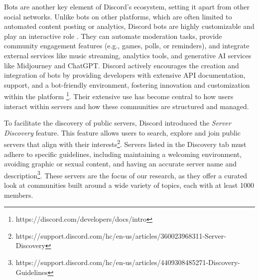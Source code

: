 Bots are another key element of Discord’s ecosystem, setting it apart from other social networks. Unlike bots on other platforms, which are often limited to automated content posting or analytics, Discord bots are highly customizable and play an interactive role \cite{moderation-discord-bots, bots-discord}. They can automate moderation tasks, provide community engagement features (e.g., games, polls, or reminders), and integrate external services like music streaming, analytics tools, and generative AI services like Midjourney and ChatGPT. Discord actively encourages the creation and integration of bots by providing developers with extensive API documentation, support, and a bot-friendly environment, fostering innovation and customization within the platform \footnote{https://discord.com/developers/docs/intro}. Their extensive use has become central to how users interact within servers and how these communities are structured and managed.

To facilitate the discovery of public servers, Discord introduced the \textit{Server Discovery} feature. This feature allows users to search, explore and join public servers that align with their interests\footnote{https://support.discord.com/hc/en-us/articles/360023968311-Server-Discovery}. Servers listed in the Discovery tab must adhere to specific guidelines, including maintaining a welcoming environment, avoiding graphic or sexual content, and having an accurate server name and description\footnote{https://support.discord.com/hc/en-us/articles/4409308485271-Discovery-Guidelines}. These servers are the focus of our research, as they offer a curated look at communities
built around a wide variety of topics, each with at least 1000 members.

